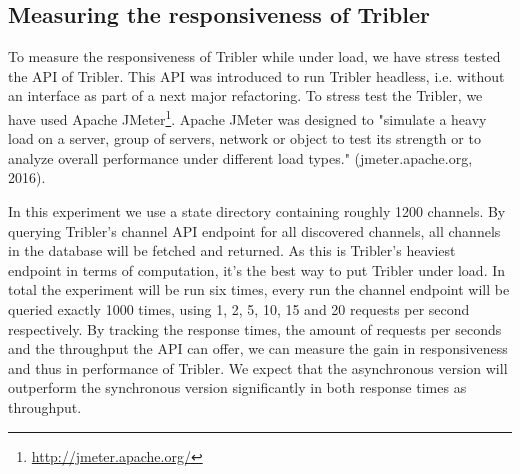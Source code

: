 \subsection{Measuring the responsiveness of Tribler}

To measure the responsiveness of Tribler while under load, we have stress tested the API of Tribler.
This API was introduced to run Tribler headless, i.e. without an interface as part of a next major refactoring.
To stress test the Tribler, we have used Apache JMeter\footnote{\url{http://jmeter.apache.org/}}.
Apache JMeter was designed to "simulate a heavy load on a server, group of servers, network or object to test its strength or to analyze overall performance under different load types." (jmeter.apache.org, 2016).

In this experiment we use a state directory containing roughly 1200 channels.
By querying Tribler's channel API endpoint for all discovered channels, all channels in the database will be fetched and returned.
As this is Tribler's heaviest endpoint in terms of computation, it's the best way to put Tribler under load.
In total the experiment will be run six times, every run the channel endpoint will be queried exactly 1000 times, using 1, 2, 5, 10, 15 and 20 requests per second respectively.
By tracking the response times, the amount of requests per seconds and the throughput the API can offer, we can measure the gain in responsiveness and thus in performance of Tribler.
We expect that the asynchronous version will outperform the synchronous version significantly in both response times as throughput.

